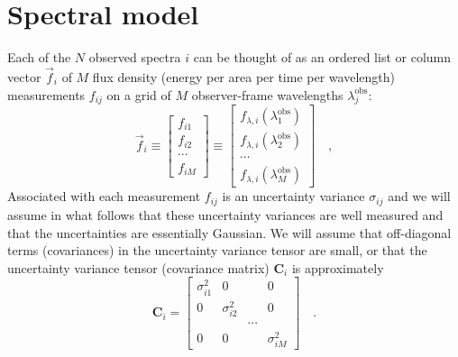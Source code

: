\documentclass[12pt,preprint]{aastex}
\newcommand{\tv}[1]{\boldsymbol{#1}}
\begin{document}
\section{Spectral model}\label{sec:model}
Each of the $N$ observed spectra $i$ can be thought of as an ordered
list or column vector $\vec{f}_i$ of $M$ flux density (energy per area
per time per wavelength) measurements $f_{ij}$ on a grid of $M$
observer-frame wavelengths $\lambda^{\mathrm{obs}}_j$:
\begin{equation}
\vec{f}_i
\equiv \left[\begin{array}{c} f_{i1} \\
                              f_{i2} \\
                              \cdots \\
                              f_{iM} \end{array}\right]
\equiv \left[\begin{array}{c} f_{\lambda,i}(\lambda^{\mathrm{obs}}_1) \\
                              f_{\lambda,i}(\lambda^{\mathrm{obs}}_2) \\
                                                \cdots \\
                              f_{\lambda,i}(\lambda^{\mathrm{obs}}_M) \end{array}\right]
\quad ,
\end{equation}
Associated with each measurement $f_{ij}$ is an uncertainty variance
$\sigma_{ij}$ and we will assume in what follows that these
uncertainty variances are well measured and that the uncertainties are
essentially Gaussian.  We will assume that off-diagonal terms
(covariances) in the uncertainty variance tensor are small, or that
the uncertainty variance tensor (covariance matrix) $\tv{C}_i$ is
approximately
\begin{equation}
\tv{C}_i =
 \left[\begin{array}{cccc} \sigma_{i1}^2 & 0 & & 0 \\
                           0 & \sigma_{i2}^2 & & 0 \\
                           & & \cdots & \\
                           0 & 0 & & \sigma_{iM}^2 \end{array}\right]
\quad .
\end{equation}
\end{document}
